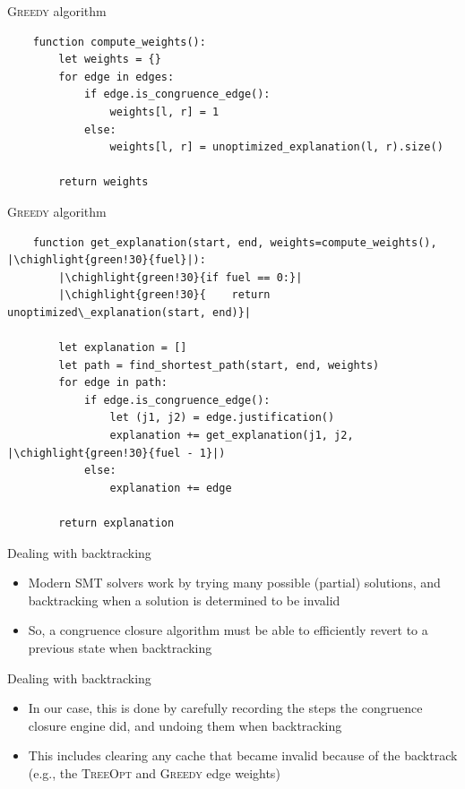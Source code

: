 \documentclass[aspectratio=169]{beamer}
\newcommand\vitem{\vfill\item}
\newcommand\chighlight[2]{\setlength{\fboxsep}{0pt}\colorbox{#1}{#2\strut}}
\begin{document}
\begin{frame}[fragile]{\textsc{Greedy} algorithm}
  \begin{verbatim}
    function compute_weights():
        let weights = {}
        for edge in edges:
            if edge.is_congruence_edge():
                weights[l, r] = 1
            else:
                weights[l, r] = unoptimized_explanation(l, r).size()

        return weights
  \end{verbatim}
\end{frame}

\begin{frame}[fragile]{\textsc{Greedy} algorithm}
  \begin{verbatim}
    function get_explanation(start, end, weights=compute_weights(), |\chighlight{green!30}{fuel}|):
        |\chighlight{green!30}{if fuel == 0:}|
        |\chighlight{green!30}{    return unoptimized\_explanation(start, end)}|

        let explanation = []
        let path = find_shortest_path(start, end, weights)
        for edge in path:
            if edge.is_congruence_edge():
                let (j1, j2) = edge.justification()
                explanation += get_explanation(j1, j2, |\chighlight{green!30}{fuel - 1}|)
            else:
                explanation += edge

        return explanation
  \end{verbatim}
\end{frame}

\begin{frame}{Dealing with backtracking}
  \begin{itemize}
    \item Modern SMT solvers work by trying many possible (partial) solutions,
    and backtracking when a solution is determined to be invalid
    \vitem So, a congruence closure algorithm must be able to efficiently revert
    to a previous state when backtracking
  \end{itemize}
\end{frame}

\begin{frame}{Dealing with backtracking}
  \begin{itemize}
    \item In our case, this is done by carefully recording the steps the
    congruence closure engine did, and undoing them when backtracking
    \vitem This includes clearing any cache that became invalid because of
    the backtrack (e.g., the \textsc{TreeOpt} and \textsc{Greedy} edge weights)
  \end{itemize}
\end{frame}
\end{document}
